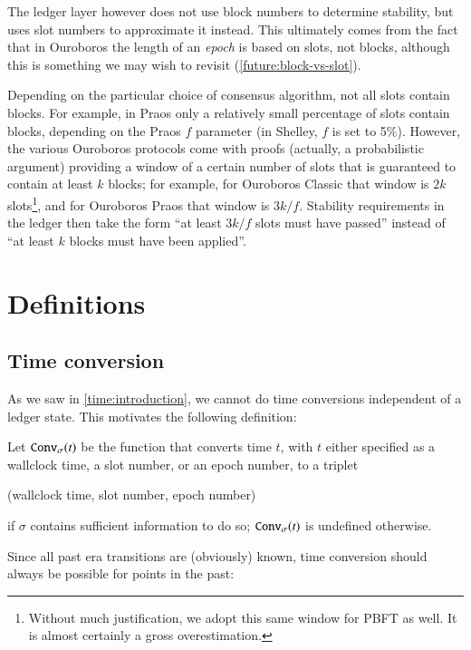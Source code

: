 The ledger layer however does not use block numbers to determine stability, but
uses slot numbers to approximate it instead. This ultimately comes from the fact
that in Ouroboros the length of an \emph{epoch} is based on slots, not blocks,
although this is something we may wish to revisit (\cref{future:block-vs-slot}).

Depending on the particular choice of consensus algorithm, not all slots contain
blocks. For example, in Praos only a relatively small percentage of slots
contain blocks, depending on the Praos $f$ parameter (in Shelley, $f$ is set to
5\%). However,  the various Ouroboros protocols come with proofs (actually, a
probabilistic argument) providing a window of a certain number of slots that is
guaranteed to contain at least $k$ blocks; for example, for Ouroboros Classic
that window is $2k$ slots\footnote{Without much justification, we adopt this
same window for PBFT as well. It is almost certainly a gross overestimation.},
and for Ouroboros Praos that window is $3k/f$. Stability requirements in the
ledger then take the form ``at least $3k/f$ slots must have passed'' instead of
``at least $k$ blocks must have been applied''.

\section{Definitions}

\subsection{Time conversion}

As we saw in \cref{time:introduction}, we cannot do time conversions independent
of a ledger state. This motivates the following definition:

\begin{definition}
Let $\mathtt{Conv}_{\sigma}(t)$ be the function that converts time $t$, with $t$
either specified as a wallclock time, a slot number, or an epoch number, to a
triplet
\begin{center}
(wallclock time, slot number, epoch number)
\end{center}
if $\sigma$ contains sufficient information to do so; $\mathtt{Conv}_{\sigma}(t)$
is undefined otherwise.
\end{definition}

Since all past era transitions are (obviously) known, time conversion should
always be possible for points in the past:

